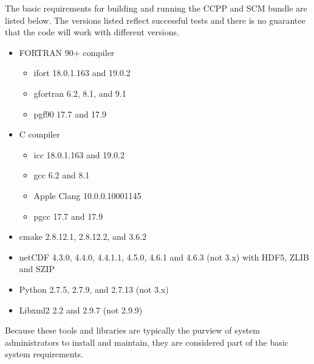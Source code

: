 The basic requirements for building and running the CCPP and SCM bundle are listed below. The versions listed reflect successful tests and there is no guarantee that the code will work with different versions.
\begin{itemize}
    \item FORTRAN 90+ compiler
    	\begin{itemize}
   	 \item ifort 18.0.1.163 and 19.0.2
	 \item gfortran 6.2, 8.1, and 9.1
	 \item pgf90 17.7 and 17.9
	 \end{itemize}
    \item C compiler
    	\begin{itemize}
	\item icc 18.0.1.163 and 19.0.2
	\item gcc 6.2 and 8.1
	\item Apple Clang 10.0.0.10001145
	\item pgcc 17.7 and 17.9
	\end{itemize}
    \item cmake 2.8.12.1, 2.8.12.2, and 3.6.2
    \item netCDF 4.3.0, 4.4.0, 4.4.1.1, 4.5.0, 4.6.1 and 4.6.3 (not 3.x) with HDF5, ZLIB and SZIP
    \item Python 2.7.5, 2.7.9, and 2.7.13 (not 3.x)
    \item Libxml2 2.2 and 2.9.7 (not 2.9.9)
\end{itemize}

Because these tools and libraries are typically the purview of system administrators to install and maintain, they are considered  part of the basic system requirements.

